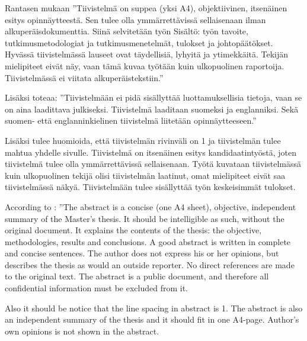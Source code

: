 \documentclass{LUT_pohja}[2016/03/09 LUT Dippa Pohja]
\author{Teemu Teekkari}
\begin{document}
\sloppy %
\makecover %
%
\newpage
{}

\begin{tiivis}%
Rantasen \citeyearpar[s. 5]{Rantanen14} mukaan ”Tiivistelmä on suppea (yksi A4), objektiivinen, itsenäinen 
esitys  opinnäytteestä.  Sen  tulee  olla  ymmärrettävissä  sellaisenaan  ilman 
alkuperäisdokumenttia. Siinä selvitetään työn Sisältö: työn tavoite, tutkimusmetodologiat 
ja tutkimusmenetelmät, tulokset ja  johtopäätökset. Hyvässä tiivistelmässä lauseet  ovat 
täydellisiä, lyhyitä ja ytimekkäitä. Tekijän mielipiteet eivät näy, vaan tämä kuvaa työtään 
kuin ulkopuolinen raportoija. Tiivistelmässä ei viitata alkuperäistekstiin.”  

Lisäksi \citet[s. 6]{Rantanen14} toteaa: ”Tiivistelmään ei pidä sisällyttää luottamuksellisia 
tietoja, vaan se on aina laadittava julkiseksi. Tiivistelmä laaditaan suomeksi ja englanniksi. 
Sekä suomen- että englanninkielinen tiivistelmä liitetään opinnäytteeseen.”  

Lisäksi tulee huomioida, että tiivistelmän rivinväli on 1 ja tiivistelmän tulee mahtua 
yhdelle sivulle. Tiivistelmä on itsenäinen esitys kandidaatintyöstä, joten tiivistelmä tulee 
olla ymmärrettävissä sellaisenaan. Työtä kuvataan tiivistelmässä kuin ulkopuolinen tekijä 
olisi tiivistelmän laatinut, omat  mielipiteet eivät saa tiivistelmässä näkyä. Tiivistelmään 
tulee sisällyttää työn keskeisimmät tulokset. \citep{Lut14}
\end{tiivis}


\begin{Abstract}%
According to \citet[s. 5]{Rantanen10}: ”The abstract is a concise (one A4 sheet), objective, 
independent summary of the Master’s thesis. It should be intelligible as such, without the 
original document. It explains the contents of the thesis: the objective, methodologies, 
results and conclusions. A good abstract is written in complete and concise sentences. The 
author does not express his or her opinions, but describes the thesis as would an outside 
reporter. No direct references are made to the original text. The abstract is a public 
document, and therefore all confidential information must be excluded from it.\par

Also it should be notice that the line spacing in abstract is 1. The abstract is also an 
independent summary of the thesis and it should fit in one A4-page. Author’s own 
opinions is not shown in the abstract.\citep{Lut14}
\end{Abstract}
\end{document}

